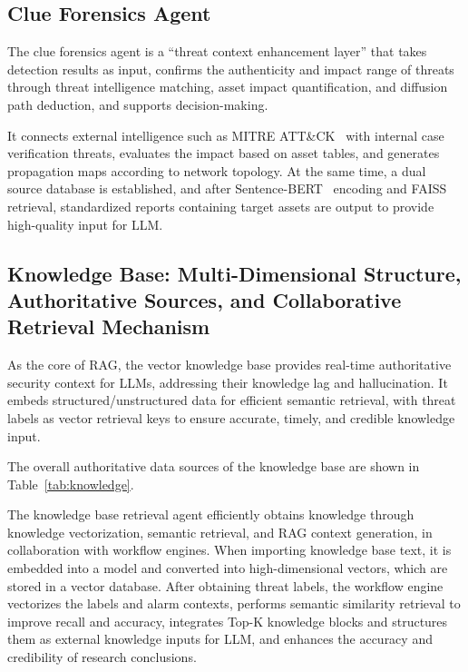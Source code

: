 \documentclass[sigconf,authordraft]{acmart}
\begin{document}
\subsection{Clue Forensics Agent}

The clue forensics agent is a ``threat context enhancement layer'' that takes detection results as input, confirms the authenticity and impact range of threats through threat intelligence matching, asset impact quantification, and diffusion path deduction, and supports decision-making.

It connects external intelligence such as MITRE ATT\&CK~\cite{ref21} with internal case verification threats, evaluates the impact based on asset tables, and generates propagation maps according to network topology. At the same time, a dual source database is established, and after Sentence-BERT~\cite{ref35} encoding and FAISS retrieval, standardized reports containing target assets are output to provide high-quality input for LLM.

\subsection{Knowledge Base: Multi-Dimensional Structure, Authoritative Sources, and Collaborative Retrieval Mechanism}

As the core of RAG, the vector knowledge base provides real-time authoritative security context for LLMs, addressing their knowledge lag and hallucination. It embeds structured/unstructured data for efficient semantic retrieval, with threat labels as vector retrieval keys to ensure accurate, timely, and credible knowledge input.

The overall authoritative data sources of the knowledge base are shown in Table~\ref{tab:knowledge}.

The knowledge base retrieval agent efficiently obtains knowledge through knowledge vectorization, semantic retrieval, and RAG context generation, in collaboration with workflow engines. When importing knowledge base text, it is embedded into a model and converted into high-dimensional vectors, which are stored in a vector database. After obtaining threat labels, the workflow engine vectorizes the labels and alarm contexts, performs semantic similarity retrieval to improve recall and accuracy, integrates Top-K knowledge blocks and structures them as external knowledge inputs for LLM, and enhances the accuracy and credibility of research conclusions.
\end{document}
